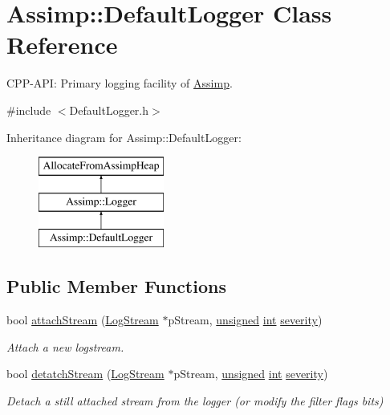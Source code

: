 \hypertarget{class_assimp_1_1_default_logger}{\section{Assimp\-:\-:Default\-Logger Class Reference}
\label{class_assimp_1_1_default_logger}
}


C\-P\-P-\/\-A\-P\-I\-: Primary logging facility of \hyperlink{namespace_assimp}{Assimp}.  




{\ttfamily \#include $<$Default\-Logger.\-h$>$}

Inheritance diagram for Assimp\-:\-:Default\-Logger\-:\begin{figure}[H]
\begin{center}
\leavevmode
\includegraphics[height=3.000000cm]{class_assimp_1_1_default_logger}
\end{center}
\end{figure}
\subsection*{Public Member Functions}
\begin{DoxyCompactItemize}
\item 
bool \hyperlink{class_assimp_1_1_default_logger_abc0ca7a337f8c3e38eca0eb45bb1ccf0}{attach\-Stream} (\hyperlink{class_assimp_1_1_log_stream}{Log\-Stream} $\ast$p\-Stream, \hyperlink{_free_image_8h_a425076c7067a1b5166e2cc530e914814}{unsigned} \hyperlink{wglew_8h_a500a82aecba06f4550f6849b8099ca21}{int} \hyperlink{glew_8h_acc39d4387d4f2d172de77ed0c5208990}{severity})
\begin{DoxyCompactList}\small\item\em Attach a new logstream. \end{DoxyCompactList}\item 
bool \hyperlink{class_assimp_1_1_default_logger_a2615f1d1624f1d742d0cf2dd4a5cccc8}{detatch\-Stream} (\hyperlink{class_assimp_1_1_log_stream}{Log\-Stream} $\ast$p\-Stream, \hyperlink{_free_image_8h_a425076c7067a1b5166e2cc530e914814}{unsigned} \hyperlink{wglew_8h_a500a82aecba06f4550f6849b8099ca21}{int} \hyperlink{glew_8h_acc39d4387d4f2d172de77ed0c5208990}{severity})
\begin{DoxyCompactList}\small\item\em Detach a still attached stream from the logger (or modify the filter flags bits) \end{DoxyCompactList}\end{DoxyCompactItemize}
